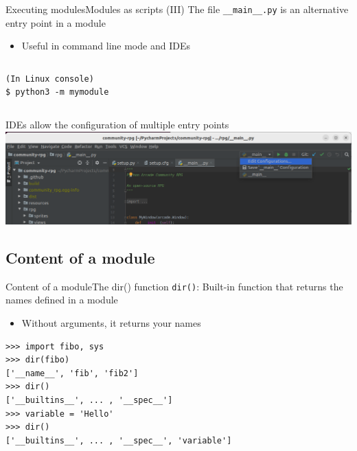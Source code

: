 \documentclass[10pt,compress]{beamer} %
\begin{document}
\begin{frame}[fragile]{Executing modules}{Modules as scripts (III)}
	The file \texttt{\_\_main\_\_.py} is an alternative entry point in a module
		\begin{itemize}
			\item Useful in command line mode and IDEs
		\end{itemize}

	\begin{columns}
	\begin{exampleblock}{}
	\vspace{-0.2cm}
	\begin{verbatim}
(In Linux console)
$ python3 -m mymodule
\end{verbatim}
	\vspace{-0.2cm}
	\end{exampleblock}
	\end{columns}

    \medskip
    IDEs allow the configuration of multiple entry points\\
    \smallskip
	    \includegraphics[width=0.8\linewidth]{figs/main-configuration}
\end{frame}

\subsection{Content of a module}

\begin{frame}[fragile]{Content of a module}{The dir() function}
	\texttt{dir()}: Built-in function that returns the names defined in a module
	\begin{itemize}
		\item Without arguments, it returns your names
	\end{itemize}

    \smallskip

	\begin{exampleblock}{}
	\begin{verbatim}
>>> import fibo, sys
>>> dir(fibo)
['__name__', 'fib', 'fib2']
>>> dir()
['__builtins__', ... , '__spec__']
>>> variable = 'Hello'
>>> dir()
['__builtins__', ... , '__spec__', 'variable']
\end{verbatim}
	\vspace{-0.2cm}
	\end{exampleblock}
\end{frame}
\end{document}
